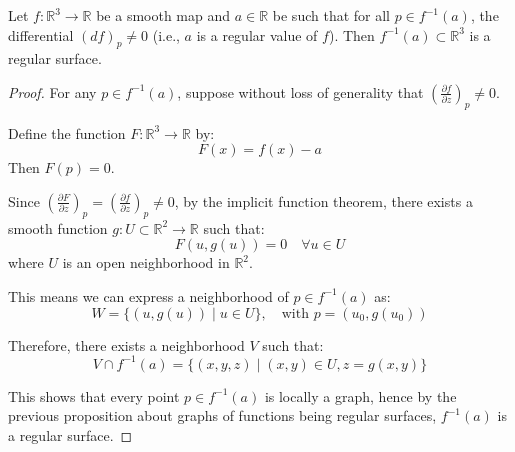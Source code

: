 \documentclass{article}
\begin{document}
\begin{example}
Let $f: \mathbb{R}^3 \rightarrow \mathbb{R}$ be a smooth map and $a \in \mathbb{R}$ be such that for all $p \in f^{-1}(a)$, the differential $(df)_p \neq 0$ (i.e., $a$ is a regular value of $f$). Then $f^{-1}(a) \subset \mathbb{R}^3$ is a regular surface.
\begin{proof}
For any $p \in f^{-1}(a)$, suppose without loss of generality that $\left(\frac{\partial f}{\partial z}\right)_p \neq 0$.

Define the function $F: \mathbb{R}^3 \rightarrow \mathbb{R}$ by:
\[
F(x) = f(x) - a
\]
Then $F(p) = 0$.

Since $\left(\frac{\partial F}{\partial z}\right)_p = \left(\frac{\partial f}{\partial z}\right)_p \neq 0$, by the implicit function theorem, there exists a smooth function $g: U \subset \mathbb{R}^2 \rightarrow \mathbb{R}$ such that:
\[
F(u, g(u)) = 0 \quad \forall u \in U
\]
where $U$ is an open neighborhood in $\mathbb{R}^2$.

This means we can express a neighborhood of $p \in f^{-1}(a)$ as:
\[
W = \{(u, g(u)) \mid u \in U\}, \quad \text{with } p = (u_0, g(u_0))
\]

Therefore, there exists a neighborhood $V$ such that:
\[
V \cap f^{-1}(a) = \{(x, y, z) \mid (x, y) \in U, z = g(x, y)\}
\]

This shows that every point $p \in f^{-1}(a)$ is locally a graph, hence by the previous proposition about graphs of functions being regular surfaces, $f^{-1}(a)$ is a regular surface.
\end{proof}
\end{example}
\end{document}
